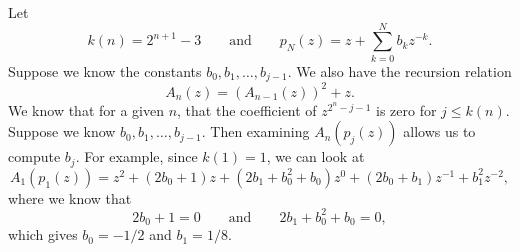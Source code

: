\documentclass[12pt, letterpaper]{article}
\begin{document}
\setlength{\fboxsep}{10pt}
\noindent
Let
\begin{equation*}
  k(n) = 2^{n+1}-3
  \qquad\textrm{and}\qquad
  p_{N}(z) = z + \sum_{k=0}^{N}b_{k}z^{-k}.
\end{equation*}
Suppose we know the constants $b_{0}, b_{1}, \ldots, b_{j-1}$.
We also have the recursion relation
\begin{equation*}
  A_{n}(z) = (A_{n-1}(z))^{2} + z.
\end{equation*}
We know that for a given $n$, that the coefficient of
$z^{2^{n}-j-1}$ is zero for $j \leq k(n)$.
Suppose we know $b_{0}, b_{1}, \ldots, b_{j-1}$.
Then examining $A_{n}(p_{j}(z))$ allows us to compute $b_{j}.$
For example, since $k(1) = 1$, we can look at
\begin{equation*}
  A_{1}(p_{1}(z))
  = z^{2} + (2b_{0}+1)z + (2b_{1} + b_{0}^{2} + b_{0})z^{0} + (2b_{0}+b_{1})z^{-1} + b_{1}^{2}z^{-2},
\end{equation*}
where we know that
\begin{equation*}
  2b_{0}+1 = 0
  \qquad\textrm{and}\qquad
  2b_{1} + b_{0}^{2} + b_{0} = 0,
\end{equation*}
which gives $b_{0} = -1/2$ and $b_{1} = 1/8$.
\end{document}
